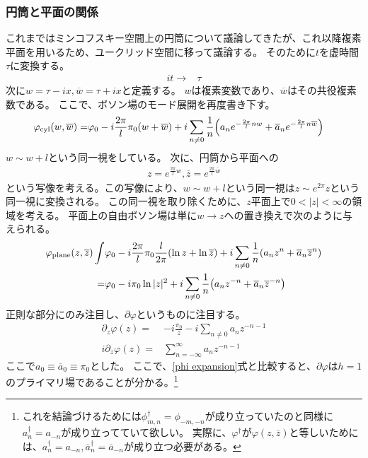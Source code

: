 \documentclass[11pt, dvipdfmx]{article}
\numberwithin{equation}{section}
\begin{document}
\subsubsection{円筒と平面の関係}
これまではミンコフスキー空間上の円筒について議論してきたが、これ以降複素平面を用いるため、ユークリッド空間に移って議論する。
そのために$t$を虚時間$\tau$に変換する。
\begin{align}
    it\rightarrow& \tau
\end{align}
次に$w=\tau-ix,\overline{w}=\tau+ix$と定義する。
$w$は複素変数であり、$\overline{w}$はその共役複素数である。
ここで、ボソン場のモード展開を再度書き下す。
\begin{align}
    \varphi_{\text{cyl}}(w,\overline{w})=&\varphi_0 - i\frac{2\pi}{l}\pi_0 (w+\overline{w}) + i\sum_{n\neq 0}\frac{1}{n}\qty(a_n e^{-\frac{2\pi}{l}n w} + \overline{a}_n e^{-\frac{2\pi}{l}n \overline{w}})
\end{align}
$w\sim w+l $という同一視をしている。
次に、円筒から平面への
\begin{align}
    z=e^{\frac{2\pi}{l}w},\overline{z}=e^{\frac{2\pi}{l}\overline{w}}
\end{align}
という写像を考える。この写像により、$w\sim w+l$という同一視は$z\sim e^{2\pi}z$という同一視に変換される。
この同一視を取り除くために、$z$平面上で$0<|z|<\infty$の領域を考える。
平面上の自由ボソン場は単に$w\rightarrow z$への置き換えで次のように与えられる。
\begin{align}
    \varphi_{\text{plane}}(z,\overline{z})\int&\varphi_0 - i\frac{2\pi}{l}\pi_0 \frac{l}{2\pi}(\ln z + \ln \overline{z}) + i\sum_{n\neq 0}\frac{1}{n}\qty(a_n z^n + \overline{a}_n \overline{z}^n)\\
    =&\varphi_0 - i \pi_0 \ln |z|^2 + i\sum_{n\neq 0}\frac{1}{n}\qty(a_n z^{-n} + \overline{a}_n \overline{z}^{-n})
\end{align}
正則な部分にのみ注目し、$\partial \varphi$というものに注目する。
\begin{align}
    \partial_z \varphi(z)=&-i \frac{\pi_0}{z} - i\sum_{n\neq 0} a_n  z^{-n-1}\\
    i\partial_z\varphi(z)=& \sum_{n=-\infty}^{\infty} a_n
    z^{-n-1}
\end{align}
ここで$a_0\equiv \overline{a}_0\equiv \pi_0$とした。
ここで、\eqref{phi expansion}式と比較すると、$\partial \varphi$は$h=1$のプライマリ場であることが分かる。\footnote{
    これを結論づけるためには$\phi_{m,n}^\dagger=\phi_{-m,-n}$が成り立っていたのと同様に$a_n^\dagger=a_{-n}$が成り立ってていて欲しい。
        実際に、$\varphi^\dagger$が$\varphi(z,\overline{z})$と等しいためには、$a_n^\dagger=a_{-n},\overline{a}_n^\dagger=\overline{a}_{-n}$が成り立つ必要がある。
}
\end{document}
